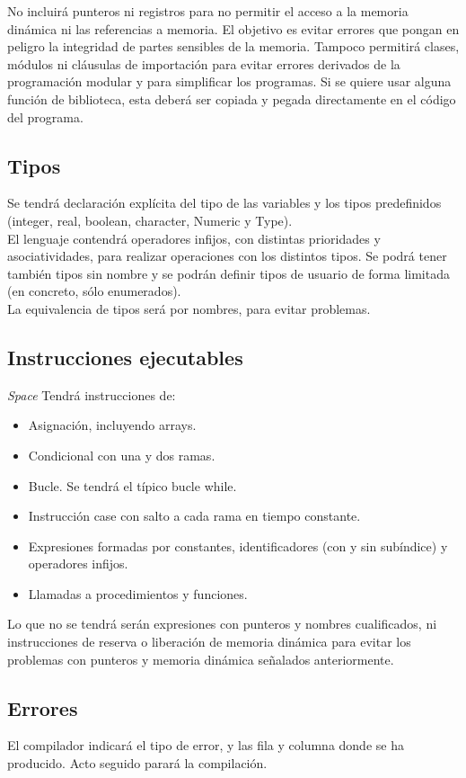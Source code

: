 \documentclass[a4paper, 12pt]{article}
\begin{document}
No incluirá punteros ni registros para no permitir el acceso a la memoria dinámica ni las referencias a memoria. El objetivo es evitar errores que pongan en peligro la integridad de partes sensibles de la memoria. Tampoco permitirá clases, módulos ni cláusulas de importación para evitar errores derivados de la programación modular y para simplificar los programas. Si se quiere usar alguna función de biblioteca, esta deberá ser copiada y pegada directamente en el código del programa.
\subsection{Tipos}
Se tendrá declaración explícita del tipo de las variables y los tipos predefinidos (integer, real, boolean, character, Numeric y Type).\\

El lenguaje contendrá operadores infijos, con distintas prioridades y asociatividades, para realizar operaciones con los distintos tipos. Se podrá tener también tipos sin nombre y se podrán definir tipos de usuario de forma limitada (en concreto, sólo enumerados).\\

La equivalencia de tipos será por nombres, para evitar problemas.

\subsection{Instrucciones ejecutables}
\textit{Space} Tendrá instrucciones de: 
\begin{itemize}
\item Asignación, incluyendo arrays. 
\item Condicional con una y dos ramas.
\item Bucle. Se tendrá el típico bucle while.
\item Instrucción case con salto a cada rama en tiempo constante.
\item Expresiones formadas por constantes, identificadores (con y sin subíndice) y operadores infijos.
\item Llamadas a procedimientos y funciones.
\end{itemize}

Lo que no se tendrá serán expresiones con punteros y nombres cualificados, ni instrucciones de reserva o liberación de memoria dinámica para evitar los problemas con punteros y memoria dinámica señalados anteriormente.
\subsection{Errores}
El compilador indicará el tipo de error, y las fila y columna donde se ha producido. Acto seguido parará la compilación.
\newpage
\end{document}
